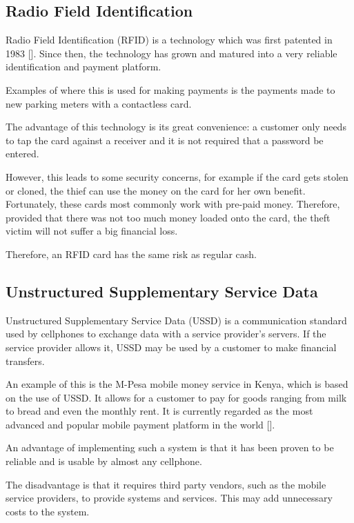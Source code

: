 \subsection{Radio Field Identification}

Radio Field Identification (RFID) is a technology which was first patented in 1983
[\cite{patent:nfc-patent}]. Since then, the technology has grown and matured into a very
reliable identification and payment platform. 

Examples of where this is used for making payments is the payments made to new parking meters
with a contactless card. 

The advantage of this technology is its great convenience: a customer only needs
to tap the card against a receiver and it is not required that a password be
entered.

However, this leads to some security concerns, for example if the card gets stolen
or cloned, the thief can use the money on the card for her own benefit.
Fortunately, these cards most commonly work with pre-paid money.
Therefore, provided that there was not too much money loaded onto the card, the
theft victim will not suffer a big financial loss. 

Therefore, an RFID card has the same risk as regular cash.

\subsection{Unstructured Supplementary Service Data}

Unstructured Supplementary Service Data (USSD) is a communication standard used by cellphones
to exchange data with a service provider's servers. If the service provider allows it, USSD may
be used by a customer to make financial transfers. 

An example of this is the M-Pesa mobile money service in Kenya, which is based on the use of
USSD. It allows for a customer to pay for goods ranging from milk to bread and even the
monthly rent. It is currently regarded as the most advanced and popular mobile payment
platform in the world [\cite{journal:m-pesa}]. 

An advantage of implementing such a system is that it has been proven to be reliable and
is usable by almost any cellphone.

The disadvantage is that it requires third party vendors, such as the mobile service
providers, to provide systems and services. This may add unnecessary costs
to the system.

